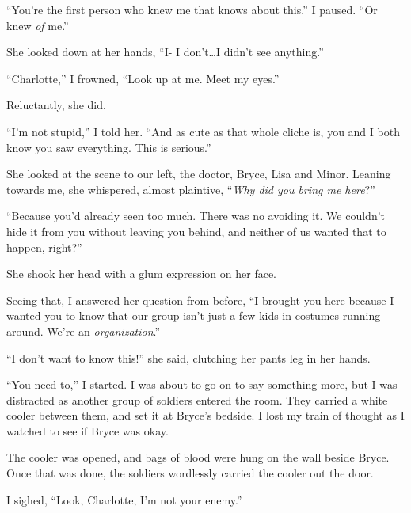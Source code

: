``You're the first person who knew me that knows about this.''  I paused.  ``Or knew \emph{of} me.''



She looked down at her hands, ``I- I don't\ldots I didn't see anything.''



``Charlotte,'' I frowned, ``Look up at me.  Meet my eyes.''



Reluctantly, she did.



``I'm not stupid,'' I told her.  ``And as cute as that whole cliche is, you and I both know you saw everything.  This is serious.''



She looked at the scene to our left, the doctor, Bryce, Lisa and Minor.  Leaning towards me, she whispered, almost plaintive, ``\emph{Why did you bring me here}?''



``Because you'd already seen too much.  There was no avoiding it.  We couldn't hide it from you without leaving you behind, and neither of us wanted that to happen, right?''



She shook her head with a glum expression on her face.



Seeing that, I answered her question from before, ``I brought you here because I wanted you to know that our group isn't just a few kids in costumes running around.  We're an \emph{organization}.''



``I don't want to know this!'' she said, clutching her pants leg in her hands.



``You need to,'' I started.  I was about to go on to say something more, but I was distracted as another group of soldiers entered the room.  They carried a white cooler between them, and set it at Bryce's bedside. I lost my train of thought as I watched to see if Bryce was okay.



The cooler was opened, and bags of blood were hung on the wall beside Bryce.  Once that was done, the soldiers wordlessly carried the cooler out the door.



I sighed, ``Look, Charlotte, I'm not your enemy.''



